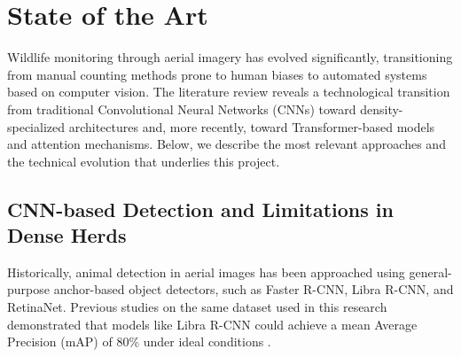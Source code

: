 \section{State of the Art}

Wildlife monitoring through aerial imagery has evolved significantly, transitioning from manual counting methods prone to human biases to automated systems based on computer vision. The literature review reveals a technological transition from traditional Convolutional Neural Networks (CNNs) toward density-specialized architectures and, more recently, toward Transformer-based models and attention mechanisms. Below, we describe the most relevant approaches and the technical evolution that underlies this project.

\subsection{CNN-based Detection and Limitations in Dense Herds}

Historically, animal detection in aerial images has been approached using general-purpose anchor-based object detectors, such as Faster R-CNN, Libra R-CNN, and RetinaNet. Previous studies on the same dataset used in this research demonstrated that models like Libra R-CNN could achieve a mean Average Precision (mAP) of 80\% under ideal conditions \cite{delplanque-data}.

